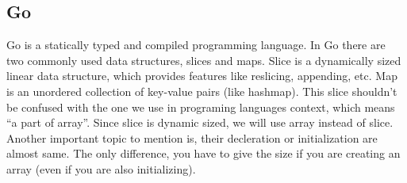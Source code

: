 \documentclass{article}
\begin{document}
\subsection{Go}
 Go is a statically typed and compiled programming language. In Go there are two commonly used data structures, slices and maps. Slice is a dynamically sized linear data structure, which provides features like reslicing, appending, etc. Map is an unordered collection of key-value pairs (like hashmap). 
This slice shouldn’t be confused with the one we use in programing languages context, which means “a part of array”. Since slice is dynamic sized, we will use array instead of slice. 
Another important topic to mention is, their decleration or initialization are almost same. The only difference, you have to give the size if you are creating an array (even if you are also initializing). 
\end{document}
